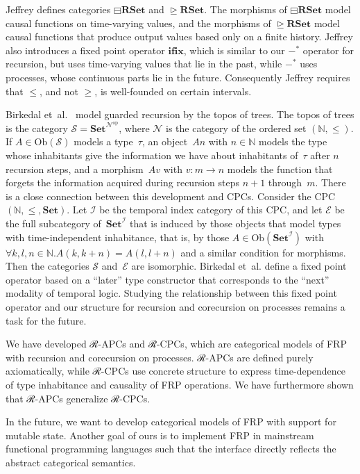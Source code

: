 \documentclass[copyright,creativecommons]{eptcs}
\newcommand{\Ob}{\mathrm{Ob}}
\newcommand{\op}[1]{#1^{\mathrm{op}}}
\newcommand{\Set}{\mathbf{Set}}
\newcommand{\rset}{\mathbf{RSet}}
\newcommand{\ifix}{\mathbf{ifix}}
\begin{document}
Jeffrey \cite[Section~2]{jeffrey:plpv-2012} defines categories ${⊟}\rset$ and
${⊵}\rset$. The morphisms of ${⊟}\rset$ model causal functions on time-varying
values, and the morphisms of ${⊵}\rset$ model causal functions that produce
output values based only on a finite history. Jeffrey also introduces a fixed
point operator $\ifix$, which is similar to our ${-}^*$ operator for recursion,
but uses time-varying values that lie in the past, while ${-}^*$ uses processes,
whose continuous parts lie in the future. Consequently Jeffrey requires that
$≤$, and not $≥$, is well-founded on certain intervals.

Birkedal et~al.~\cite{birkedal:lmcs-8-4} model guarded recursion by the topos of
trees. The topos of trees is the category $𝒮 = \Set^{\op{𝒩}}$, where $𝒩$ is the
category of the ordered set $(ℕ, ≤)$. If $A ∈ \Ob(𝒮)$ models a type~$τ$, an
object~$An$ with $n ∈ ℕ$ models the type whose inhabitants give the information
we have about inhabitants of~$τ$ after $n$ recursion steps, and a morphism~$Av$
with $v : m → n$ models the function that forgets the information acquired
during recursion steps $n + 1$ through~$m$. There is a close connection between
this development and CPCs. Consider the CPC $(ℕ, ≤, \Set)$. Let $ℐ$ be the
temporal index category of this CPC, and let $ℰ$ be the full subcategory
of~$\Set^ℐ$ that is induced by those objects that model types with
time-independent inhabitance, that is, by those $A ∈ \Ob\left(\Set^ℐ\right)$
with $∀ k, l, n ∈ ℕ . A(k, k + n) = A(l, l + n)$ and a similar condition for
morphisms. Then the categories $𝒮$ and~$ℰ$ are isomorphic. Birkedal et~al.
define a fixed point operator based on a “later” type constructor that
corresponds to the “next” modality of temporal logic. Studying the relationship
between this fixed point operator and our structure for recursion and
corecursion on processes remains a task for the future.


We have developed ℛ-APCs and ℛ-CPCs, which are categorical models of FRP with
recursion and corecursion on processes. ℛ-APCs are defined purely axiomatically,
while ℛ-CPCs use concrete structure to express time-dependence of type
inhabitance and causality of FRP operations. We have furthermore shown that
ℛ-APCs generalize ℛ-CPCs.

In the future, we want to develop categorical models of FRP with support for
mutable state. Another goal of ours is to implement FRP in mainstream functional
programming languages such that the interface directly reflects the abstract
categorical semantics.
\end{document}
